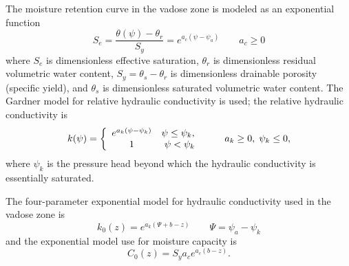 \documentclass[12pt,letterpaper]{article}
\begin{document}
The moisture retention curve in the vadose zone is modeled as an
exponential function
\begin{equation}\nonumber
S_e = \frac{\theta(\psi) - \theta_r}{S_y} = e^{a_c \left( \psi - \psi_a \right)} \qquad a_c \ge 0
\end{equation}
where $S_e$ is dimensionless effective saturation, $\theta_r$ is
dimensionless residual volumetric water content, $S_y=\theta_s -
\theta_r$ is dimensionless drainable porosity (specific yield), and
$\theta_s$ is dimensionless saturated volumetric water content.  The
Gardner model for relative hydraulic conductivity is used; the
relative hydraulic conductivity is
\begin{equation}
  \nonumber
  k(\psi) = \left  \{
    \begin{array}{c c}
      e^{a_k \left( \psi - \psi_k\right)} & \psi \le \psi_k, \ \\
      1 & \psi < \psi_k\\
    \end{array}
\right . \qquad a_k \ge 0,\; \psi_k \le 0,
\end{equation}
where $\psi_k$ is the pressure head beyond which the hydraulic
conductivity is essentially saturated.

The four-parameter exponential model for hydraulic conductivity used
in the vadose zone is
\begin{equation}
  \label{eq:Gardner}
 k_0(z)=e^{a_k\left( \Psi + b - z\right)} \qquad \Psi=\psi_a-\psi_k
\end{equation}
and the exponential model use for moisture capacity is
\begin{equation}
  \label{eq:mrc}
C_0(z) = S_y a_c e^{a_c \left( b-z\right)}.
\end{equation}
\end{document}
